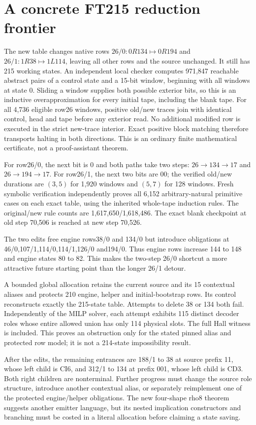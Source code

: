 \section{A concrete FT215 reduction frontier}
The new table changes native rows $26/0:0R134\mapsto0R194$ and
$26/1:1R38\mapsto1L114$, leaving all other rows and the source unchanged.
It still has 215 working states. An independent local checker computes 971,847
reachable abstract pairs of a control state and a 15-bit window, beginning with
all windows at state 0. Sliding a window supplies both possible exterior bits,
so this is an inductive overapproximation for every initial tape, including the
blank tape. For all 4,736 eligible row26 windows, positive old/new traces join
with identical control, head and tape before any exterior read. No additional
modified row is executed in the strict new-trace interior. Exact positive block
matching therefore transports halting in both directions. This is an ordinary
finite mathematical certificate, not a proof-assistant theorem.

For row26/0, the next bit is 0 and both paths take two steps:
$26\to 134\to17$ and $26\to194\to17$.
For row26/1, the next two bits are 00; the verified old/new durations are
$(3,5)$ for 1,920 windows and $(5,7)$ for 128 windows.
Fresh symbolic verification independently proves all 6,152 arbitrary-natural
primitive cases on each exact table, using the inherited whole-tape induction
rules. The original/new rule counts are 1,617,650/1,618,486. The exact blank
checkpoint at old step 70,506 is reached at new step 70,526.

The two edits free engine rows38/0 and 134/0 but introduce obligations at
46/0,107/1,114/0,114/1,126/0 and194/0. Thus engine rows increase 144 to 148 and
engine states 80 to 82. This makes the two-step 26/0 shortcut a more attractive
future starting point than the longer 26/1 detour.

A bounded global allocation retains the current source and its 15 contextual
aliases and protects 210 engine, helper and initial-bootstrap rows. Its control
reconstructs exactly the 215-state table. Attempts to delete 38 or 134 both fail.
Independently of the MILP solver, each attempt exhibits 115 distinct decoder
roles whose entire allowed union has only 114 physical slots. The full Hall
witness is included. This proves an obstruction only for the stated pinned
alias and protected row model; it is not a 214-state impossibility result.

After the edits, the remaining entrances are 188/1 to 38 at source prefix 11,
whose left child is CI6, and 312/1 to 134 at prefix 001, whose left child is CD3.
Both right children are nonterminal. Further progress must change the source
role structure, introduce another contextual alias, or separately reimplement
one of the protected engine/helper obligations. The new four-shape rho8 theorem
suggests another emitter language, but its nested implication constructors and
branching must be costed in a literal allocation before claiming a state saving.
